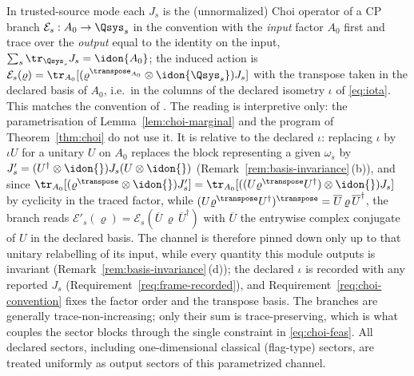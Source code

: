 
\begin{remark}\label{rem:ordering}
In trusted-source mode each $J_s$ is the (unnormalized) Choi operator of a
CP branch $\mathcal{E}_s:A_0\to\Qsys_s$ in the convention with the
\emph{input} factor $A_0$ first and trace over the \emph{output} equal to
the identity on the input, $\sum_s\tr_{\Qsys_s}J_s=\idon{A_0}$; the induced
action is
$\mathcal E_s(\varrho)=\tr_{A_0}[(\varrho^{\transpose_{A_0}}
\otimes\idon{\Qsys_s})J_s]$ with the transpose taken in the declared basis
of $A_0$, i.e.\ in the columns of the declared isometry $\iota$ of
\eqref{eq:iota}. This matches the convention of
\cite[Eqs.~(82)--(83) and (85)--(86)]{kamin2025renyi}. The reading is
interpretive only: the parametrisation of Lemma~\ref{lem:choi-marginal} and
the program of Theorem~\ref{thm:choi} do not use it. It is relative
to the declared $\iota$: replacing $\iota$ by $\iota U$ for a unitary $U$
on $A_0$ replaces the block representing a given $\omega_s$ by
$J'_s=(U^{\dagger}\otimes\idon{})J_s(U\otimes\idon{})$
(Remark~\ref{rem:basis-invariance}\,(b)), and since
$\tr_{A_0}[(\varrho^{\transpose}\otimes\idon{})J'_s]
=\tr_{A_0}[((U\varrho^{\transpose}U^{\dagger})\otimes\idon{})J_s]$ by
cyclicity in the traced factor, while
$(U\varrho^{\transpose}U^{\dagger})^{\transpose}
=\overline{U}\,\varrho\,\overline{U}^{\dagger}$, the branch reads
$\mathcal E'_s(\varrho)
=\mathcal E_s(\overline{U}\,\varrho\,\overline{U}^{\dagger})$ with
$\overline{U}$ the entrywise complex conjugate of $U$ in the declared
basis. The channel is therefore pinned down only up to that unitary
relabelling of its input, while every quantity this module outputs is
invariant (Remark~\ref{rem:basis-invariance}\,(d)); the declared $\iota$ is
recorded with any reported $J_s$ (Requirement~\ref{req:frame-recorded}),
and Requirement~\ref{req:choi-convention} fixes the factor order and the
transpose basis. The branches are generally
trace-non-increasing; only their sum is trace-preserving, which is what
couples the sector blocks through the single constraint in
\eqref{eq:choi-feas}. All declared sectors, including one-dimensional
classical (flag-type) sectors, are treated uniformly as output sectors of
this parametrized channel.
\end{remark}
